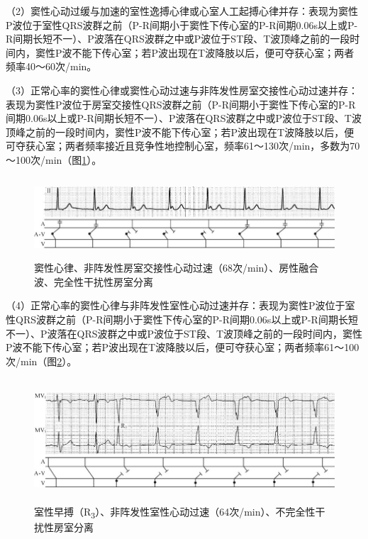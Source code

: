 （2）窦性心动过缓与加速的室性逸搏心律或心室人工起搏心律并存：表现为窦性P波位于室性QRS波群之前（P-R间期小于窦性下传心室的P-R间期0.06s以上或P-R间期长短不一）、P波落在QRS波群之中或P波位于ST段、T波顶峰之前的一段时间内，窦性P波不能下传心室；若P波出现在T波降肢以后，便可夺获心室；两者频率40～60次/min。

（3）正常心率的窦性心律或窦性心动过速与非阵发性房室交接性心动过速并存：表现为窦性P波位于房室交接性QRS波群之前（P-R间期小于窦性下传心室的P-R间期0.06s以上或P-R间期长短不一）、P波落在QRS波群之中或P波位于ST段、T波顶峰之前的一段时间内，窦性P波不能下传心室；若P波出现在T波降肢以后，便可夺获心室；两者频率接近且竞争性地控制心室，频率61～130次/min，多数为70～100次/min（图\ref{fig26-11}）。

\begin{figure}[!htbp]
 \centering
 \includegraphics[width=5.78125in,height=1.1875in]{./images/Image00452.jpg}
 \captionsetup{justification=centering}
 \caption{窦性心律、非阵发性房室交接性心动过速（68次/min）、房性融合波、完全性干扰性房室分离}
 \label{fig26-11}
  \end{figure} 

（4）正常心率的窦性心律与非阵发性室性心动过速并存：表现为窦性P波位于室性QRS波群之前（P-R间期小于窦性下传心室的P-R间期0.06s以上或P-R间期长短不一）、P波落在QRS波群之中或P波位于ST段、T波顶峰之前的一段时间内，窦性P波不能下传心室；若P波出现在T波降肢以后，便可夺获心室；两者频率61～100次/min（图\ref{fig26-12}）。

\begin{figure}[!htbp]
 \centering
 \includegraphics[width=5.80208in,height=1.8125in]{./images/Image00453.jpg}
 \captionsetup{justification=centering}
 \caption{室性早搏（R\textsubscript{3}）、非阵发性室性心动过速（64次/min）、不完全性干扰性房室分离}
 \label{fig26-12}
  \end{figure} 


